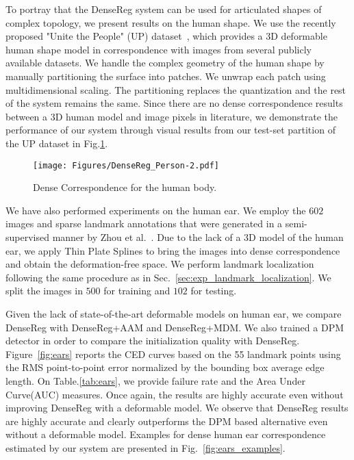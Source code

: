 \documentclass[10pt,twocolumn,letterpaper]{article}
\begin{document}
To portray that the DenseReg system can be used for articulated shapes of complex topology, we present results on the human shape. We use the recently proposed "Unite the People" (UP) dataset~\cite{lassner2017unite}, which provides a 3D deformable human shape model \cite{loper2015smpl} in correspondence with images from several publicly available datasets. We handle the complex geometry of the human shape by manually partitioning the surface into patches. We unwrap each patch using multidimensional scaling. The partitioning replaces the quantization and the rest of the system remains the same. Since there are no dense correspondence results between a 3D human model and image pixels in literature, we demonstrate the performance of our system through visual results from our test-set partition of the UP dataset in Fig.\ref{fig:DenseReg_Human}.
 
 \begin{figure}[!h]
\centering
\texttt{[image: Figures/DenseReg\_Person-2.pdf]}
\caption{Dense Correspondence for the human body.}
\vspace{-0.25cm}
\label{fig:DenseReg_Human}
\end{figure}%

We have also performed experiments on the human ear. We employ the $602$ images and sparse landmark annotations that were generated in a semi-supervised manner by Zhou et al.~\cite{Zhou_2016_CVPR}. Due to the lack of a 3D model of the human ear, we apply Thin Plate Splines to bring the images into dense correspondence and obtain the deformation-free space. We perform landmark localization following the same procedure as in Sec.~\ref{sec:exp_landmark_localization}.
We split the images in $500$ for training and $102$ for testing.  


Given the lack of state-of-the-art deformable models on human ear, we compare DenseReg with DenseReg+AAM and DenseReg+MDM.  We also trained a DPM detector in order to compare the initialization quality with DenseReg. Figure~\ref{fig:ears} reports the CED curves based on the 55 landmark points using the RMS point-to-point error normalized by the bounding box average edge length. On Table.\ref{tab:ears}, we provide failure rate and the Area Under Curve(AUC) measures. Once again, the results are highly accurate even without improving DenseReg with a deformable model. We observe that DenseReg results are highly accurate and clearly outperforms the DPM based alternative even without a deformable model. Examples for dense human ear correspondence estimated by our system  are presented in Fig.~\ref{fig:ears_examples}.
\end{document}
